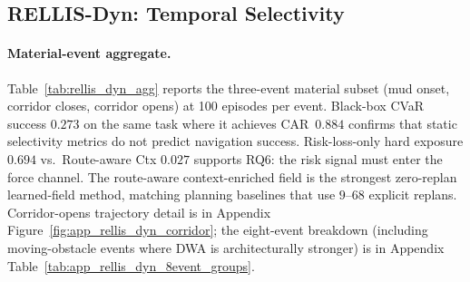\subsection{RELLIS-Dyn: Temporal Selectivity}
\label{sec:exp_rellis_dyn}

\paragraph{Material-event aggregate.}
Table~\ref{tab:rellis_dyn_agg} reports the three-event material subset
(mud onset, corridor closes, corridor opens) at 100 episodes per event.
Black-box CVaR success $0.273$ on the same task where it achieves
CAR~$0.884$ confirms that static selectivity metrics do not predict
navigation success.
Risk-loss-only hard exposure $0.694$ vs.\ Route-aware Ctx $0.027$
supports RQ6: the risk signal must enter the force channel.
The route-aware context-enriched field is the strongest zero-replan learned-field method,
matching planning baselines that use $9$--$68$ explicit replans.
Corridor-opens trajectory detail is in Appendix
Figure~\ref{fig:app_rellis_dyn_corridor}; the eight-event breakdown
(including moving-obstacle events where DWA is architecturally
stronger) is in Appendix Table~\ref{tab:app_rellis_dyn_8event_groups}.

